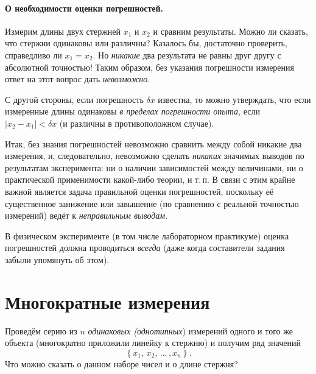 
\paragraph{О необходимости оценки погрешностей.}

Измерим длины двух стержней $x_{1}$ и $x_{2}$ и сравним результаты.
Можно ли сказать, что стержни одинаковы или различны? Казалось бы,
достаточно проверить, справедливо ли $x_{1}=x_{2}$. Но \emph{никакие}
два результата не равны друг другу с абсолютной точностью! Таким образом,
без указания погрешности измерения ответ на этот вопрос дать \emph{невозможно}.

С другой стороны, если погрешность $\delta x$ известна, то можно
утверждать, что если измеренные длины одинаковы \emph{в пределах погрешности
опыта}, если $|x_{2}-x_{1}|<\delta x$ (и различны в противоположном
случае).

Итак, без знания погрешностей невозможно сравнить между собой никакие
два измерения, и, следовательно, невозможно сделать \emph{никаких}
значимых выводов по результатам эксперимента: ни о наличии зависимостей
между величинами, ни о практической применимости какой-либо теории,
и т.\,п. В связи с этим крайне важной является задача правильной
оценки погрешностей, поскольку её существенное занижение или завышение
(по сравнению с реальной точностью измерений) ведёт к \emph{неправильным
выводам}.

В физическом эксперименте (в том числе лабораторном практикуме) оценка
погрешностей должна проводиться \emph{всегда}
(даже когда составители задания забыли упомянуть об этом).

\section{Многократные измерения}

Проведём серию из $n$ \emph{одинаковых (однотипных}) измерений одного
и того же объекта (многократно приложили линейку к стержню) и получим
ряд значений
\[
\left\{ x_{1},\,x_{2},\,\ldots\,,x_{n}\right\} .
\]
Что можно сказать о данном наборе чисел и о длине стержня?

